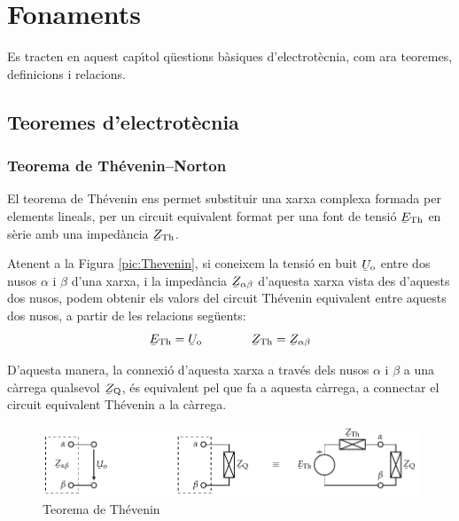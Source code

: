 \chapter{Fonaments}

Es tracten en aquest cap\'{\i}tol q\"{u}estions b\`{a}siques
d'electrot\`{e}cnia, com ara teoremes, definicions i relacions.

\section{Teoremes d'electrot\`{e}cnia}\label{sec:teoremes}

\subsection{\texorpdfstring{Teorema de Th\'{e}venin--Norton}{Teorema de
            Th\'{e}venin-Norton}}\label{sec:T_N}

El teorema de Th\'{e}venin ens permet
substituir una xarxa complexa formada per elements lineals, per un
circuit equivalent format per una font de tensi\'{o} $\cmplx{E}\ped{Th}$
en s\`{e}rie amb una imped\`{a}ncia $\cmplx{Z}\ped{Th}$.

Atenent a la Figura \vref{pic:Thevenin}, si coneixem la tensi\'{o} en
buit $\cmplx{U}\ped{o}$ entre dos nusos $\alpha$ i $\beta$ d'una
xarxa, i la imped\`{a}ncia $\cmplx{Z}_{\alpha\beta}$ d'aquesta xarxa
vista des d'aquests dos nusos, podem obtenir els valors del circuit
Th\'{e}venin equivalent entre aquests dos nusos, a partir de les
relacions seg\"{u}ents:
\begin{equation}
   \cmplx{E}\ped{Th} = \cmplx{U}\ped{o} \qquad\qquad  \cmplx{Z}\ped{Th} = \cmplx{Z}_{\alpha\beta}
\end{equation}

D'aquesta manera, la connexi\'{o} d'aquesta xarxa a trav\'{e}s dels nusos
$\alpha$ i $\beta$ a una c\`{a}rrega qualsevol $\cmplx{Z}\ped{Q}$, \'{e}s
equivalent pel que fa a aquesta c\`{a}rrega, a connectar el circuit
equivalent Th\'{e}venin a la c\`{a}rrega.
\begin{figure}[htb]
\centering
    \includegraphics{Imatges/Cap-Fonaments-Thevenin.pdf}
\caption{Teorema de Th\'{e}venin} \label{pic:Thevenin}
\end{figure}

